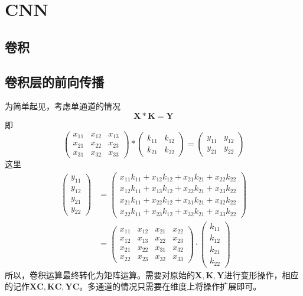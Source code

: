 \section{CNN}
\subsection{卷积}
\subsection{卷积层的前向传播}
为简单起见，考虑单通道的情况
\begin{equation}
	\boldsymbol{X} * \boldsymbol{K} = \boldsymbol{Y}
\end{equation}
即
\begin{equation}
	\begin{pmatrix}
	x_{11}&  x_{12}& x_{13} \\ 
	x_{21}&  x_{22}&  x_{23}\\ 
	x_{31}&  x_{32}& x_{33}
	\end{pmatrix} * 
	\begin{pmatrix}
	k_{11}& k_{12} \\ 
	k_{21}& k_{22}
	\end{pmatrix} =
	\begin{pmatrix}
	y_{11}& y_{12} \\ 
	y_{21}& y_{22}
	\end{pmatrix} 
\end{equation}
这里
\begin{equation}
	\begin{aligned}
	\begin{pmatrix}
	y_{11}\\ 
	y_{12}\\ 
	y_{21}\\ 
	y_{22}
	\end{pmatrix} &= 
	\begin{pmatrix}
	x_{11}k_{11} +x_{12}k_{12} +x_{21}k_{21} +x_{22}k_{22} \\ 
	x_{12}k_{11} +x_{13}k_{12} +x_{22}k_{21} +x_{23}k_{22}\\
	x_{21}k_{11} +x_{22}k_{12} +x_{31}k_{21} +x_{32}k_{22}\\
	x_{22}k_{11} +x_{23}k_{12} +x_{32}k_{21} +x_{33}k_{22}
	\end{pmatrix}\\
	&=\begin{pmatrix}
	x_{11} &x_{12} &x_{21} &x_{22}  \\ 
	x_{12} &x_{13} &x_{22} &x_{23} \\
	x_{21} &x_{22} &x_{31} &x_{32} \\
	x_{22} &x_{23} &x_{32} &x_{33} 
	\end{pmatrix} \cdot 
	\begin{pmatrix}
	k_{11}\\ 
	k_{12}\\ 
	k_{21}\\ 
	k_{22}
	\end{pmatrix}
	\end{aligned}
\end{equation}
所以，卷积运算最终转化为矩阵运算。需要对原始的$\boldsymbol{X},\boldsymbol{K},\boldsymbol{Y}$进行变形操作，相应的记作$\boldsymbol{XC},\boldsymbol{KC},\boldsymbol{YC}$。多通道的情况只需要在维度上将操作扩展即可。
